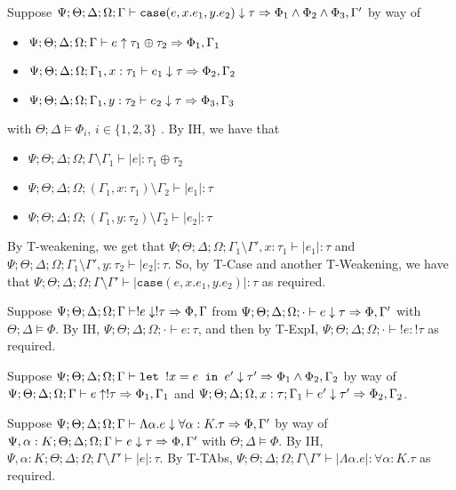   \item[AT-Case] Suppose $\Psi ; \Theta ; \Delta ; \Omega ; \Gamma \vdash \texttt{case}(e,x.e_1,y.e_2) \downarrow \tau \Rightarrow \Phi_1 \wedge \Phi_2 \wedge \Phi_3, \Gamma'$ by way of
  \begin{itemize}
    \item $\Psi ; \Theta ; \Delta ; \Omega ; \Gamma \vdash e \uparrow \tau_1 \oplus \tau_2 \Rightarrow \Phi_1, \Gamma_1$
    \item $\Psi ; \Theta ; \Delta ; \Omega ; \Gamma_1, x: \tau_1 \vdash e_1 \downarrow \tau \Rightarrow \Phi_2,\Gamma_2$
    \item $\Psi ; \Theta ; \Delta ; \Omega ; \Gamma_1, y: \tau_2 \vdash e_2 \downarrow \tau \Rightarrow \Phi_3,\Gamma_3$
  \end{itemize}
  with $\Theta ; \Delta \vDash \Phi_i$, $i \in \{1,2,3\}$ . By IH, we have that
  \begin{itemize}
    \item $\Psi ; \Theta ; \Delta ; \Omega ; \Gamma \setminus \Gamma_1 \vdash |e| : \tau_1 \oplus \tau_2$
    \item $\Psi ; \Theta ; \Delta ; \Omega ; (\Gamma_1, x: \tau_1) \setminus \Gamma_2 \vdash |e_1| : \tau$
    \item $\Psi ; \Theta ; \Delta ; \Omega ; (\Gamma_1, y: \tau_2) \setminus \Gamma_2 \vdash |e_2| : \tau$
  \end{itemize}
  By T-weakening, we get that $\Psi ; \Theta ; \Delta ; \Omega ; \Gamma_1 \setminus \Gamma', x : \tau_1 \vdash |e_1| : \tau$ and $\Psi ; \Theta ; \Delta ; \Omega ; \Gamma_1 \setminus \Gamma', y : \tau_2 \vdash |e_2| : \tau$. So, by T-Case and another T-Weakening, we have that
  $\Psi ; \Theta ; \Delta ; \Omega ; \Gamma \setminus \Gamma' \vdash |\texttt{case}(e,x.e_1,y.e_2)| : \tau$ as required.
  
  \item[AT-ExpI] Suppose $\Psi ; \Theta ; \Delta ; \Omega ; \Gamma \vdash !e \downarrow !\tau \Rightarrow \Phi, \Gamma$ from $\Psi ; \Theta ; \Delta ; \Omega ; \cdot \vdash e \downarrow \tau \Rightarrow \Phi, \Gamma'$ with $\Theta ; \Delta \vDash \Phi$. By IH, $\Psi ; \Theta ; \Delta ; \Omega ; \cdot \vdash e : \tau$, and then by T-ExpI, $\Psi ; \Theta ; \Delta ; \Omega ; \cdot \vdash !e : !\tau$ as required.
  \item[AT-ExpE] Suppose $\Psi ; \Theta ; \Delta ; \Omega ; \Gamma \vdash \texttt{let } !x = e \texttt{ in } e' \downarrow \tau' \Rightarrow \Phi_1 \wedge \Phi_2, \Gamma_2$ by way of $\Psi ; \Theta ; \Delta ; \Omega ; \Gamma \vdash e \uparrow !\tau \Rightarrow \Phi_1,\Gamma_1$ and $\Psi ; \Theta ; \Delta ; \Omega, x : \tau ; \Gamma_1 \vdash e' \downarrow \tau' \Rightarrow \Phi_2,\Gamma_2$. 
  \item[AT-TAbs] Suppose $\Psi ; \Theta ; \Delta ; \Omega ; \Gamma \vdash \Lambda \alpha. e \downarrow \forall \alpha : K.\tau \Rightarrow \Phi,\Gamma'$ by way of $\Psi, \alpha : K ; \Theta ; \Delta ; \Omega ; \Gamma \vdash e \downarrow \tau \Rightarrow \Phi, \Gamma'$ with $\Theta ; \Delta \vDash \Phi$. By IH,  $\Psi, \alpha : K ; \Theta ; \Delta ; \Omega ; \Gamma\setminus \Gamma' \vdash |e| : \tau$. By T-TAbs, $\Psi ; \Theta ; \Delta ; \Omega ; \Gamma \setminus \Gamma' \vdash |\Lambda \alpha. e| : \forall \alpha : K.\tau$ as required.
  
